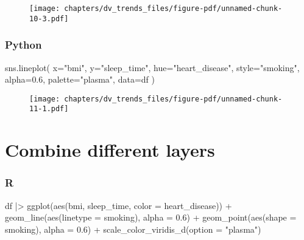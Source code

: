 \documentclass[
  letterpaper,
  DIV=11,
  numbers=noendperiod]{scrreprt}
\newenvironment{Shaded}{\begin{snugshade}}{\end{snugshade}}
\newcommand{\AttributeTok}[1]{\textcolor[rgb]{0.40,0.46,0.14}{#1}}
\newcommand{\FloatTok}[1]{\textcolor[rgb]{0.68,0.00,0.00}{#1}}
\newcommand{\FunctionTok}[1]{\textcolor[rgb]{0.28,0.35,0.67}{#1}}
\newcommand{\NormalTok}[1]{\textcolor[rgb]{0.00,0.46,0.62}{#1}}
\newcommand{\OperatorTok}[1]{\textcolor[rgb]{0.37,0.37,0.37}{#1}}
\newcommand{\SpecialCharTok}[1]{\textcolor[rgb]{0.37,0.37,0.37}{#1}}
\newcommand{\StringTok}[1]{\textcolor[rgb]{0.13,0.47,0.30}{#1}}
\begin{document}
\begin{figure}[H]

{\centering \texttt{[image: chapters/dv\_trends\_files/figure-pdf/unnamed-chunk-10-3.pdf]}

}

\end{figure}

\hypertarget{python-41}{%
\subsubsection{Python}\label{python-41}}

\begin{Shaded}
\begin{Highlighting}[]
\NormalTok{sns.lineplot(}
\NormalTok{    x}\OperatorTok{=}\StringTok{"bmi"}\NormalTok{, y}\OperatorTok{=}\StringTok{"sleep\_time"}\NormalTok{, hue}\OperatorTok{=}\StringTok{"heart\_disease"}\NormalTok{, style}\OperatorTok{=}\StringTok{"smoking"}\NormalTok{,}
\NormalTok{    alpha}\OperatorTok{=}\FloatTok{0.6}\NormalTok{, }
\NormalTok{    palette}\OperatorTok{=}\StringTok{"plasma"}\NormalTok{,}
\NormalTok{    data}\OperatorTok{=}\NormalTok{df}
\NormalTok{)}
\end{Highlighting}
\end{Shaded}

\begin{figure}[H]

{\centering \texttt{[image: chapters/dv\_trends\_files/figure-pdf/unnamed-chunk-11-1.pdf]}

}

\end{figure}

\hypertarget{combine-different-layers}{%
\section{Combine different layers}\label{combine-different-layers}}

\hypertarget{r-42}{%
\subsubsection{R}\label{r-42}}

\begin{Shaded}
\begin{Highlighting}[]
\NormalTok{df }\SpecialCharTok{|\textgreater{}} 
    \FunctionTok{ggplot}\NormalTok{(}\FunctionTok{aes}\NormalTok{(bmi, sleep\_time, }\AttributeTok{color =}\NormalTok{ heart\_disease)) }\SpecialCharTok{+}
    \FunctionTok{geom\_line}\NormalTok{(}\FunctionTok{aes}\NormalTok{(}\AttributeTok{linetype =}\NormalTok{ smoking), }\AttributeTok{alpha =} \FloatTok{0.6}\NormalTok{) }\SpecialCharTok{+}
    \FunctionTok{geom\_point}\NormalTok{(}\FunctionTok{aes}\NormalTok{(}\AttributeTok{shape =}\NormalTok{ smoking), }\AttributeTok{alpha =} \FloatTok{0.6}\NormalTok{) }\SpecialCharTok{+}
    \FunctionTok{scale\_color\_viridis\_d}\NormalTok{(}\AttributeTok{option =} \StringTok{"plasma"}\NormalTok{)}
\end{Highlighting}
\end{Shaded}
\end{document}
